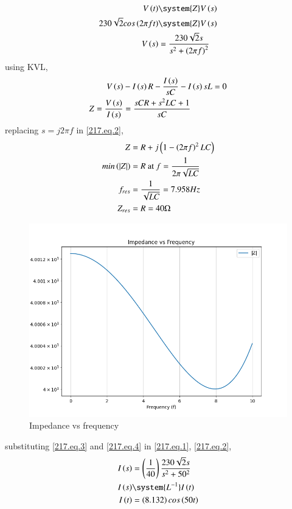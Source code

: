 \documentclass[journal,12pt,twocolumn]{IEEEtran}
\begin{document}
\begin{align}
    V\brak{t} &\system{Z} V\brak{s}\\
    230\sqrt{2} cos\brak{2\pi f t} &\system{Z} V\brak{s}\\
    V\brak{s} & = \frac{230\sqrt{2}s}{s^2 + \brak{2\pi f}^2}\label{217.eq.1}
\end{align}
using KVL, 
\begin{align}
    V\left(s\right) & - I\left(s\right) R - \frac{I\left(s\right)}{sC} - I\left(s\right)sL = 0\\
    Z = \frac{V\left(s\right)}{I\left(s\right)} & = \frac{sCR + s^2LC + 1}{sC}\label{217.eq.2}
\end{align}
replacing $s = j2\pi f$ in \eqref{217.eq.2},
\begin{align}
    Z & = R + j\left(1-\left(2\pi f\right)^2LC\right)\\
    min\left(|Z|\right) & = R \text{ at } f = \frac{1}{2\pi\sqrt{LC}}\\ 
    f_{res} & = \frac{1}{\sqrt{LC}} = 7.958 Hz\label{217.eq.3}\\
    Z_{res} & = R = 40 \Omega\label{217.eq.4}
\end{align}
\begin{figure}[h]
    \centering
	\includegraphics[width=\columnwidth]{figs/impedance.png}
    \caption{Impedance vs frequency}
    \label{217.fig.3}
\end{figure}
substituting \eqref{217.eq.3} and \eqref{217.eq.4} in \eqref{217.eq.1}, \eqref{217.eq.2},
\begin{align}
    I\brak{s} & = \brak{\frac{1}{40}}\frac{230\sqrt{2}s}{s^2 + 50^2}\label{217.eq.6}\\
    I\brak{s} & \system{L^{-1}} I\brak{t}\\
    I\brak{t} & = \brak{8.132} cos\brak{50 t} \label{217.eq.5}
\end{align}
\end{document}
